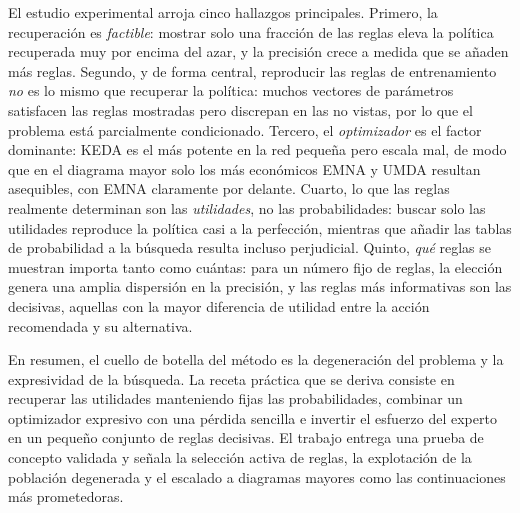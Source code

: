 El estudio experimental arroja cinco hallazgos principales. Primero, la
recuperación es \emph{factible}: mostrar solo una fracción de las reglas eleva la
política recuperada muy por encima del azar, y la precisión crece a medida que se
añaden más reglas. Segundo, y de forma central, reproducir las reglas de
entrenamiento \emph{no} es lo mismo que recuperar la política: muchos vectores de
parámetros satisfacen las reglas mostradas pero discrepan en las no vistas, por
lo que el problema está parcialmente condicionado. Tercero, el \emph{optimizador}
es el factor dominante: KEDA es el más potente en la red pequeña pero escala mal,
de modo que en el diagrama mayor solo los más económicos EMNA y UMDA resultan
asequibles, con EMNA claramente por delante. Cuarto, lo que las reglas realmente
determinan son las \emph{utilidades}, no las probabilidades: buscar solo las
utilidades reproduce la política casi a la perfección, mientras que añadir las
tablas de probabilidad a la búsqueda resulta incluso perjudicial. Quinto,
\emph{qué} reglas se muestran importa tanto como cuántas: para un número fijo de
reglas, la elección genera una amplia dispersión en la precisión, y las reglas
más informativas son las decisivas, aquellas con la mayor diferencia de utilidad
entre la acción recomendada y su alternativa.

En resumen, el cuello de botella del método es la degeneración del problema y la
expresividad de la búsqueda. La receta práctica que se deriva consiste en recuperar las
utilidades manteniendo fijas las probabilidades, combinar un optimizador
expresivo con una pérdida sencilla e invertir el esfuerzo del experto en un
pequeño conjunto de reglas decisivas. El trabajo entrega una prueba de concepto
validada y señala la selección activa de reglas, la explotación de la población
degenerada y el escalado a diagramas mayores como las continuaciones más
prometedoras.


\newpage

